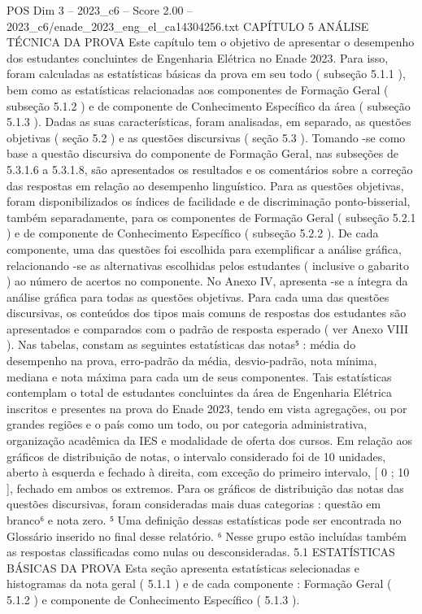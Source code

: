\begin{textsample}{POS Dim 3 – 2023\_c6 – Score 2.00 – 2023\_c6/enade\_2023\_eng\_el\_ca14304256.txt}  \label{ex:f3_pos_103}
CAPÍTULO 5 ANÁLISE TÉCNICA DA PROVA Este capítulo tem o objetivo de apresentar o desempenho dos estudantes concluintes de Engenharia Elétrica no Enade 2023.
Para isso, foram calculadas as estatísticas básicas da prova em seu todo ( subseção 5.1.1 ), bem como as estatísticas relacionadas aos componentes de Formação Geral ( subseção 5.1.2 ) e de componente de Conhecimento Específico da área ( subseção 5.1.3 ).
Dadas as suas características, foram analisadas, em separado, as questões objetivas ( seção 5.2 ) e as questões discursivas ( seção 5.3 ).
Tomando -se como base a questão discursiva do componente de Formação Geral, nas subseções de 5.3.1.6 a 5.3.1.8, são apresentados os resultados e os comentários sobre a correção das respostas em relação ao desempenho linguístico.
Para as questões objetivas, foram disponibilizados os índices de facilidade e de discriminação ponto-bisserial, também separadamente, para os componentes de Formação Geral ( subseção 5.2.1 ) e de componente de Conhecimento Específico ( subseção 5.2.2 ).
De cada componente, uma das questões foi escolhida para exemplificar a análise gráfica, relacionando -se as alternativas escolhidas pelos estudantes ( inclusive o gabarito ) ao número de acertos no componente.
No Anexo IV, apresenta -se a íntegra da análise gráfica para todas as questões objetivas.
Para cada uma das questões discursivas, os conteúdos dos tipos mais comuns de respostas dos estudantes são apresentados e comparados com o padrão de resposta esperado ( ver Anexo VIII ).
Nas tabelas, constam as seguintes estatísticas das notas⁵ : média do desempenho na prova, erro-padrão da média, desvio-padrão, nota mínima, mediana e nota máxima para cada um de seus componentes.
Tais estatísticas contemplam o total de estudantes concluintes da área de Engenharia Elétrica inscritos e presentes na prova do Enade 2023, tendo em vista agregações, ou por grandes regiões e o país como um todo, ou por categoria administrativa, organização acadêmica da IES e modalidade de oferta dos cursos.
Em relação aos gráficos de distribuição de notas, o intervalo considerado foi de 10 unidades, aberto à esquerda e fechado à direita, com exceção do primeiro intervalo, [ 0 ; 10 ], fechado em ambos os extremos.
Para os gráficos de distribuição das notas das questões discursivas, foram consideradas mais duas categorias : questão em branco⁶ e nota zero. ⁵ Uma definição dessas estatísticas pode ser encontrada no Glossário inserido no final desse relatório. ⁶ Nesse grupo estão incluídas também as respostas classificadas como nulas ou desconsideradas. 5.1 ESTATÍSTICAS BÁSICAS DA PROVA Esta seção apresenta estatísticas selecionadas e histogramas da nota geral ( 5.1.1 ) e de cada componente : Formação Geral ( 5.1.2 ) e componente de Conhecimento Específico ( 5.1.3 ).

\end{textsample}

